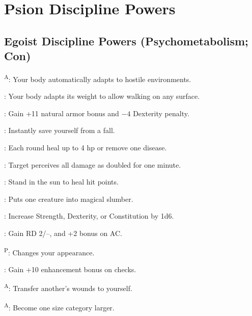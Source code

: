\section{Psion Discipline Powers}



\subsection{Egoist Discipline Powers {\normalsize(Psychometabolism; Con)}}
\begin{enumerate*}
\item {}\textsuperscript{A}: Your body automatically adapts to hostile environments.

      : Your body adapts its weight to allow walking on any surface.

      : Gain +11 natural armor bonus and $-4$ Dexterity penalty.

      : Instantly save yourself from a fall. %

      : Each round heal up to 4 hp or remove one disease.


      : Target perceives all damage as doubled for one minute.

      : Stand in the sun to heal hit points.

      : Puts one creature into magical slumber.

\item {}: Increase Strength, Dexterity, or Constitution by 1d6.

      : Gain RD 2/--, and +2 bonus on AC.

      \textsuperscript{P}: Changes your appearance.

      : Gain +10 enhancement bonus on  checks. %

      \textsuperscript{A}: Transfer another's wounds to yourself. %

      \textsuperscript{A}: Become one size category larger. %


\end{enumerate*}
